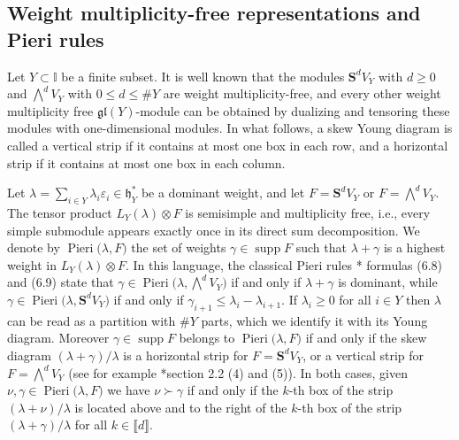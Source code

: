 \documentclass[11pt,fleqn]{amsart}
\newcommand\II{\mathbb I}
\renewcommand\epsilon{\varepsilon}
\theoremstyle{definition}
\theoremstyle{remark}
\theoremstyle{remark}
\newcommand\gl{\mathfrak{gl}}
\renewcommand\SS{\mathbf S}
\newcommand\interval[1]{\llbracket{#1}\rrbracket}
\newcommand\lie[1]{\mathfrak{#1}}
\DeclareMathOperator\supp{supp}
\newcommand\Pieri[2]{\operatorname{Pieri}{(#1},{#2)}}
\begin{document}
\subsection{Weight multiplicity-free representations and Pieri rules}
Let $Y \subset \II$ be a finite subset. It is well known that the modules 
$\SS^dV_Y$ with $d \geq 0$ and $\bigwedge^d V_Y$ with $0 \leq d \leq \# Y$ are 
weight multiplicity-free, and every other weight multiplicity free 
$\gl(Y)$-module can be obtained by dualizing and tensoring these modules with 
one-dimensional modules. In what follows, a skew Young diagram is called a 
vertical strip if it contains at most one box in each row, and a horizontal 
strip if it contains at most one box in each column.

Let $\lambda = \sum_{i \in Y} \lambda_i \epsilon_i \in \lie h_Y^*$ be a 
dominant weight, and let $F = \SS^dV_Y$ or $F = \bigwedge^d V_Y$. 
The tensor product $L_Y (\lambda) \otimes F$ is semisimple and multiplicity 
free, i.e., every simple submodule appears exactly once in its direct sum 
decomposition. We denote by $\Pieri{\lambda}{F}$ the set of weights $\gamma \in 
\supp F$ such that $\lambda + \gamma$ is a highest weight in $L_Y(\lambda) 
\otimes F$. In this language, the classical Pieri rules \cite{FH91}*{
formulas (6.8) and (6.9)} state that $\gamma \in \Pieri{\lambda}{\bigwedge^d 
V_Y}$ if and only if $\lambda + \gamma$ is dominant, while $\gamma \in 
\Pieri{\lambda}{\SS^dV_Y}$ if and only if $\gamma_{i+1} \leq 
\lambda_i - \lambda_{i+1}$. If $\lambda_i \geq 0$ for all $i \in Y$ then 
$\lambda$ can be read as a partition with $\# Y$ parts, which we identify it 
with its Young diagram. Moreover $\gamma \in \supp F$ belongs to 
$\Pieri{\lambda}{F}$ if and only if the skew diagram $(\lambda + \gamma) / 
\lambda$ is a horizontal strip for $F = \SS^dV_Y$, or a vertical strip 
for $F = \bigwedge^d V_Y$ (see for example \cite{Fulton97}*{section 2.2 (4) and 
(5)}). In both cases, given $\nu,\gamma \in \Pieri{\lambda}{F}$ we have $\nu 
\succ \gamma$ if and only if the $k$-th box of the strip $(\lambda + \nu) 
/\lambda$ is located above and to the right of the $k$-th box of the strip 
$(\lambda + \gamma) / \lambda$ for all $k \in \interval d$. 
\end{document}
